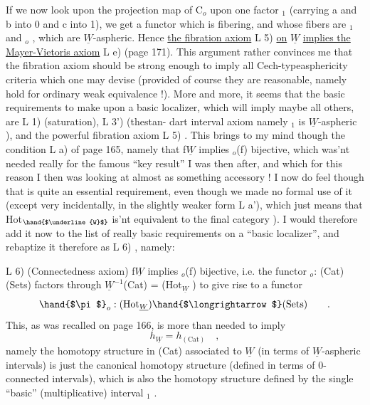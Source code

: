 
If we now look upon the projection map of C$_o$ upon one factor \hand{$\Delta$}$_1$
(carrying a and b  into \hand{$\{$}0\hand{$\}$} and c into \hand{$\{$}1\hand{$\}$}),  we get a functor which is
fibering,  and  whose fibers are \hand{$\Delta$}$_1$ and \hand{$\Delta$}$_o$ ,  which are $\underline{W}$-aspheric.
\margin{$\times$}Hence \uline{the fibration axiom} L 5)  \uline{on} $\underline{W}$  \uline{implies the Mayer-Vietoris axiom}
L e) (page 171).   This argument rather convinces me that the fibration
axiom should be strong enough to imply all \hand{$\check{\ }$}Cech-typeasphericity criteria
which one may devise (provided of course they are reasonable,  namely
hold for ordinary weak equivalence !).   More and more,  it seems that
the basic requirements to make upon a  basic localizer,  which
will imply maybe all others,  are L 1) (saturation),  L 3')  (thestan-%
dart interval axiom namely  $_1$  is $\underline{W}$-aspheric ),  and the powerful
fibration axiom L 5) .  This brings to my mind though the condition L a)
of page 165,  namely that  f\hand{$\in$}$\underline{W}$  implies  \hand{$\pi$}$_o$(f)  bijective,  which was'nt
needed really for the famous ``key result'' I was then after,  and which
for this reason I then was looking at almost as something accessory !
I now do feel though that is quite an essential requirement,  even though
we made no formal use of it  (except very incidentally,  in the slightly
weaker form  L a'),  which just means that Hot$_{\hand{$\underline{W}$}}$ is'nt equivalent to the
final category ).   I would therefore add it now to the list of really
basic requirements on a ``basic localizer'',  and rebaptize it therefore
as  L 6) ,  namely:

L 6)  (Connectedness axiom)  f\hand{$\in$}$\underline{W}$  implies  \hand{$\pi$}$_o$(f)  bijective,  i.e.
the functor  \hand{$\pi$}$_o$: (Cat)\hand{$\rightarrow$}(Sets)  factors through  $\underline{W}^{-1}$(Cat)  =
(Hot$_{\underline{W}}$ )  to give rise to a functor
\[ \hand{$\pi$}_o : (\mathrm{Hot}_{\underline{W}}) \hand{$\longrightarrow$} (\mathrm{Sets}) \qquad . \]
This,   as was recalled on page 166,  is more than needed to imply
\[ h_{\underline{W}} = h_{(\mathrm{Cat})} \quad , \]
namely the homotopy structure in (Cat)  associated to $\underline{W}$  (in terms of
$\underline{W}$-aspheric intervals)  is just the canonical homotopy structure (defined
in terms of 0-connected intervals),  which is also the homotopy structure
defined by the single ``basic'' (multiplicative) interval \hand{$\Delta$}$_1$ .

